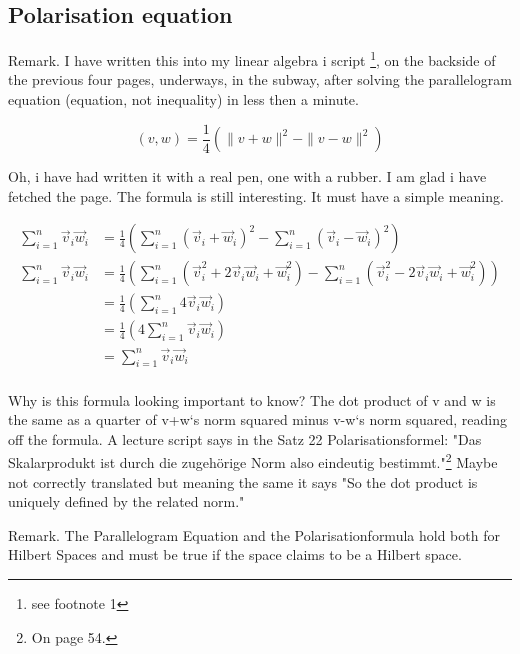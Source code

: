 \documentclass[a4paper]{article}
\begin{document}
\begin{Example}
\subsection{Polarisation equation}

Remark. I have written this into my linear algebra i script \cite{FerusLA}\footnote{see footnote 1}, on the backside of the previous four pages, underways, 
in the subway, after solving the parallelogram equation (equation, not inequality) in less then a minute. 

\begin{displaymath}
(v,w) = \frac{1}{4}(\|v+w\|^{2}-\|v-w\|^{2})
\end{displaymath}

Oh, i have had written it with a real pen, one with a rubber. I am glad i have fetched the page. The formula is still interesting.
It must have a simple meaning.

\begin{displaymath}
\begin{align}
\sum_{i=1}^{n}\vec{v}_{i}\vec{w}_{i} &= \frac{1}{4}(\sum_{i=1}^{n}(\vec{v}_{i}+\vec{w}_{i})^{2} - \sum_{i=1}^{n}(\vec{v}_{i}-\vec{w}_{i})^{2}) \\
\sum_{i=1}^{n}\vec{v}_{i}\vec{w}_{i} &= \frac{1}{4}(\sum_{i=1}^{n}(\vec{v}_{i}^{2}+2\vec{v}_{i}\vec{w}_{i}+\vec{w}_{i}^{2})-\sum_{i=1}^{n}(\vec{v}_{i}^{2}-2\vec{v}_{i}\vec{w}_{i}+\vec{w}_{i}^{2}))\\
&= \frac{1}{4}(\sum_{i=1}^{n}4\vec{v}_{i}\vec{w}_{i})\\
&= \frac{1}{4}(4\sum_{i=1}^{n}\vec{v}_{i}\vec{w}_{i})\\
&= \sum_{i=1}^{n}\vec{v}_{i}\vec{w}_{i}\\
\end{align}
\end{displaymath}

Why is this formula looking important to know? The dot product of v and w is the same as a quarter of v+w`s norm squared minus v-w`s norm squared, reading off the formula. A lecture script \cite{FerusLA} says in the Satz 22 Polarisationsformel: "Das Skalarprodukt ist durch die zugeh\"orige Norm also eindeutig bestimmt."\footnote{On page 54.} Maybe not correctly translated but meaning the same it says "So the dot product is uniquely defined by the related norm."

Remark. The Parallelogram Equation and the Polarisationformula hold both for Hilbert Spaces and must be true if the space claims to be a Hilbert space.



\end{Example}
\end{document}
